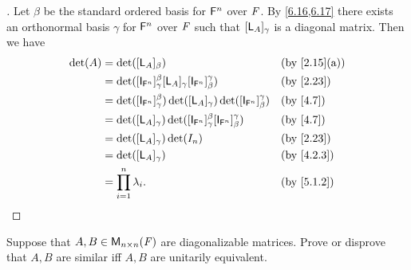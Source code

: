 \begin{proof}[]
  Let \(\beta\) be the standard ordered basis for \(\mathsf{F}^n\) over \(\mathit{F}\).
  By \cref{6.16,6.17} there exists an orthonormal basis \(\gamma\) for \(\mathsf{F}^n\) over \(\mathit{F}\) such that \([\mathsf{L}_A]_{\gamma}\) is a diagonal matrix.
  Then we have
  \begin{align*}
    \det(A) & = \det([\L_A]_{\beta})                                                                                &  & \by{2.15}[a] \\
            & = \det([\IT[\vs{F}^n]]_{\gamma}^{\beta} [\L_A]_{\gamma} [\IT[\vs{F}^n]]_{\beta}^{\gamma})             &  & \by{2.23}    \\
            & = \det([\IT[\vs{F}^n]]_{\gamma}^{\beta}) \det([\L_A]_{\gamma}) \det([\IT[\vs{F}^n]]_{\beta}^{\gamma}) &  & \by{4.7}     \\
            & = \det([\L_A]_{\gamma}) \det([\IT[\vs{F}^n]]_{\gamma}^{\beta} [\IT[\vs{F}^n]]_{\beta}^{\gamma})       &  & \by{4.7}     \\
            & = \det([\L_A]_{\gamma}) \det(I_n)                                                                     &  & \by{2.23}    \\
            & = \det([\L_A]_{\gamma})                                                                               &  & \by{4.2.3}   \\
            & = \prod_{i = 1}^n \lambda_i.                                                                          &  & \by{5.1.2}
  \end{align*}
\end{proof}

\begin{ex}\label{ex:6.5.13}
  Suppose that \(A, B \in \ms[n][n][\F]\) are diagonalizable matrices.
  Prove or disprove that \(A, B\) are similar iff \(A, B\) are unitarily equivalent.
\end{ex}

